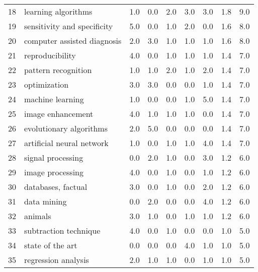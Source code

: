 \begin{tabular}{llrrrrrrr}
18 &                      learning algorithms &   1.0 &   0.0 &   2.0 &   3.0 &   3.0 &   1.8 &    9.0 \\
19 &              sensitivity and specificity &   5.0 &   0.0 &   1.0 &   2.0 &   0.0 &   1.6 &    8.0 \\
20 &              computer assisted diagnosis &   2.0 &   3.0 &   1.0 &   1.0 &   1.0 &   1.6 &    8.0 \\
21 &                          reproducibility &   4.0 &   0.0 &   1.0 &   1.0 &   1.0 &   1.4 &    7.0 \\
22 &                      pattern recognition &   1.0 &   1.0 &   2.0 &   1.0 &   2.0 &   1.4 &    7.0 \\
23 &                             optimization &   3.0 &   3.0 &   0.0 &   0.0 &   1.0 &   1.4 &    7.0 \\
24 &                         machine learning &   1.0 &   0.0 &   0.0 &   1.0 &   5.0 &   1.4 &    7.0 \\
25 &                        image enhancement &   4.0 &   1.0 &   1.0 &   1.0 &   0.0 &   1.4 &    7.0 \\
26 &                  evolutionary algorithms &   2.0 &   5.0 &   0.0 &   0.0 &   0.0 &   1.4 &    7.0 \\
27 &                artificial neural network &   1.0 &   0.0 &   1.0 &   1.0 &   4.0 &   1.4 &    7.0 \\
28 &                        signal processing &   0.0 &   2.0 &   1.0 &   0.0 &   3.0 &   1.2 &    6.0 \\
29 &                         image processing &   4.0 &   0.0 &   1.0 &   0.0 &   1.0 &   1.2 &    6.0 \\
30 &                       databases, factual &   3.0 &   0.0 &   1.0 &   0.0 &   2.0 &   1.2 &    6.0 \\
31 &                              data mining &   0.0 &   2.0 &   0.0 &   0.0 &   4.0 &   1.2 &    6.0 \\
32 &                                  animals &   3.0 &   1.0 &   0.0 &   1.0 &   1.0 &   1.2 &    6.0 \\
33 &                    subtraction technique &   4.0 &   0.0 &   1.0 &   0.0 &   0.0 &   1.0 &    5.0 \\
34 &                         state of the art &   0.0 &   0.0 &   0.0 &   4.0 &   1.0 &   1.0 &    5.0 \\
35 &                      regression analysis &   2.0 &   1.0 &   1.0 &   0.0 &   1.0 &   1.0 &    5.0 \\

\end{tabular}

